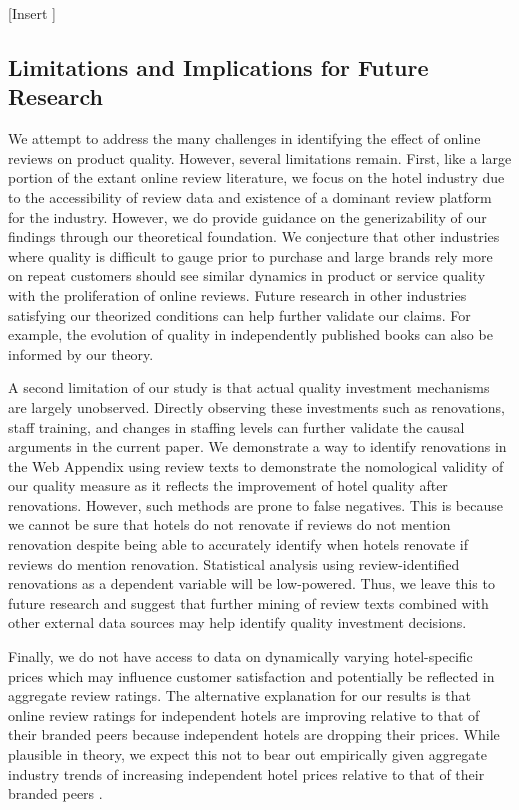 \documentclass[mksc,blindrev]{informs3} %
\begin{document}
[Insert ]

\subsection{Limitations and Implications for Future Research}

We attempt to address the many challenges in identifying the effect of online reviews on product quality. However, several limitations remain. First, like a large portion of the extant online review literature, we focus on the hotel industry due to the accessibility of review data and existence of a dominant review platform for the industry. However, we do provide guidance on the generizability of our findings through our theoretical foundation. We conjecture that other industries where quality is difficult to gauge prior to purchase and large brands rely more on repeat customers should see similar dynamics in product or service quality with the proliferation of online reviews. Future research in other industries satisfying our theorized conditions can help further validate our claims. For example, the evolution of quality in independently published books can also be informed by our theory.

A second limitation of our study is that actual quality investment mechanisms are largely unobserved. Directly observing these investments such as renovations, staff training, and changes in staffing levels can further validate the causal arguments in the current paper. We demonstrate a way to identify renovations in the Web Appendix using review texts to demonstrate the nomological validity of our quality measure as it reflects the improvement of hotel quality after renovations. However, such methods are prone to false negatives. This is because we cannot be sure that hotels do not renovate if reviews do not mention renovation despite being able to accurately identify when hotels renovate if reviews do mention renovation. Statistical analysis using review-identified renovations as a dependent variable will be low-powered. Thus, we leave this to future research and suggest that further mining of review texts combined with other external data sources may help identify quality investment decisions.

Finally, we do not have access to data on dynamically varying hotel-specific prices which may influence customer satisfaction and potentially be reflected in aggregate review ratings. The alternative explanation for our results is that online review ratings for independent hotels are improving relative to that of their branded peers because independent hotels are dropping their prices. While plausible in theory, we expect this not to bear out empirically given aggregate industry trends of increasing independent hotel prices relative to that of their branded peers .
\end{document}

